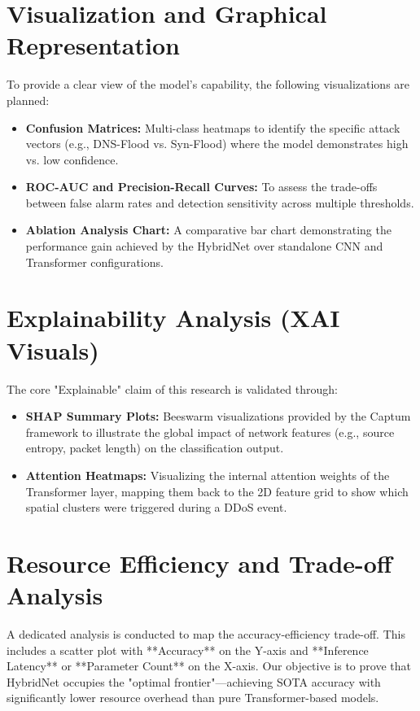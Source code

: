 \documentclass[12pt, a4paper]{report}
\begin{document}
\section{Visualization and Graphical Representation}
To provide a clear view of the model's capability, the following visualizations are planned:
\begin{itemize}
    \item \textbf{Confusion Matrices:} Multi-class heatmaps to identify the specific attack vectors (e.g., DNS-Flood vs. Syn-Flood) where the model demonstrates high vs. low confidence.
    \item \textbf{ROC-AUC and Precision-Recall Curves:} To assess the trade-offs between false alarm rates and detection sensitivity across multiple thresholds.
    \item \textbf{Ablation Analysis Chart:} A comparative bar chart demonstrating the performance gain achieved by the HybridNet over standalone CNN and Transformer configurations.
\end{itemize}

\section{Explainability Analysis (XAI Visuals)}
The core "Explainable" claim of this research is validated through:
\begin{itemize}
    \item \textbf{SHAP Summary Plots:} Beeswarm visualizations provided by the Captum framework to illustrate the global impact of network features (e.g., source entropy, packet length) on the classification output.
    \item \textbf{Attention Heatmaps:} Visualizing the internal attention weights of the Transformer layer, mapping them back to the 2D feature grid to show which spatial clusters were triggered during a DDoS event.
\end{itemize}

\section{Resource Efficiency and Trade-off Analysis}
A dedicated analysis is conducted to map the accuracy-efficiency trade-off. This includes a scatter plot with **Accuracy** on the Y-axis and **Inference Latency** or **Parameter Count** on the X-axis. Our objective is to prove that HybridNet occupies the "optimal frontier"—achieving SOTA accuracy with significantly lower resource overhead than pure Transformer-based models.
\end{document}
